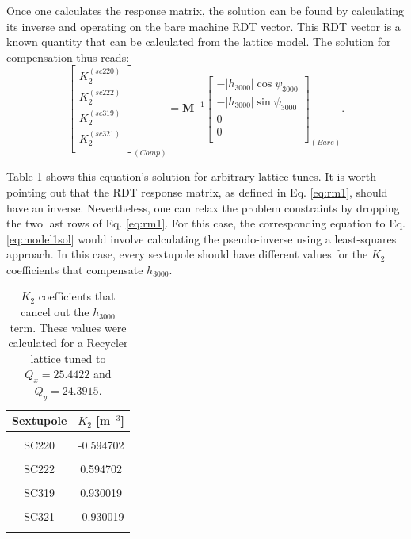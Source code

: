 Once one calculates the response matrix, the solution can be found by calculating its inverse and operating on the bare machine RDT vector. This RDT vector is a known quantity that can be calculated from the lattice model. The solution for compensation thus reads:
\begin{equation}
    \label{eq:model1sol}
    \begin{bmatrix}
        K_2^{(sc220)} \\
        K_2^{(sc222)}\\
        K_2^{(sc319)} \\
        K_2^{(sc321)}\\
    \end{bmatrix}_{(Comp)}
    =
    \boldsymbol{M}^{-1} 
    \begin{bmatrix}
        -|h_{3000}| \cos \psi_{3000} \\
        -|h_{3000}| \sin \psi_{3000} \\
        0 \\
        0 \\
    \end{bmatrix}_{(Bare)}.
\end{equation}

Table \ref{tab:k2sh3000} shows this equation's solution for arbitrary lattice tunes. It is worth pointing out that the RDT response matrix, as defined in Eq. \ref{eq:rm1}, should have an inverse. Nevertheless, one can relax the problem constraints by dropping the two last rows of Eq. \ref{eq:rm1}. For this case, the corresponding equation to Eq. \ref{eq:model1sol} would involve calculating the pseudo-inverse using a least-squares approach. In this case, every sextupole should have different values for the $ K_2 $ coefficients that compensate $h_{3000}$. 

\begin{table}[H]
    \centering
    \caption{$K_2$ coefficients that cancel out the $h_{3000}$ term. These values were calculated for a Recycler lattice tuned to $Q_x=25.4422$ and $Q_y=24.3915$.}
    \label{tab:k2sh3000}
    \begin{tabular}{cc}
    \toprule
    \textbf{Sextupole} & $K_2$ [m$^{-3}$] \\ \midrule
     &  \\
    SC220 & -0.594702 \\
     &  \\
    SC222 & 0.594702 \\
     &  \\
    SC319 & 0.930019 \\
     &  \\
    SC321 & -0.930019 \\
     &  \\ \hline
    \end{tabular}
    \end{table}

